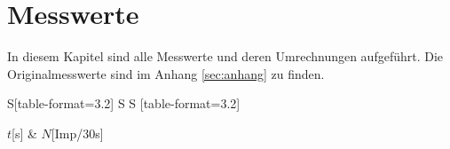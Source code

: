 \section{Messwerte}
\label{sec:messwerte}
In diesem Kapitel sind alle Messwerte und deren Umrechnungen aufgeführt. Die Originalmesswerte 
sind im Anhang \autoref{sec:anhang} zu finden.

\begin{table}
    
    \centering
    \caption{Zerfallszahlen Vanadium mit Poisson-Fehler}
    \begin{tabular}{S[table-format=3.2] S S   [table-format=3.2]}
      
      \toprule
      {$t$[s]} & {$N$[Imp/30s]}\\
      \midrule

\bottomrule
    
    \end{tabular}
  \end{table}

  